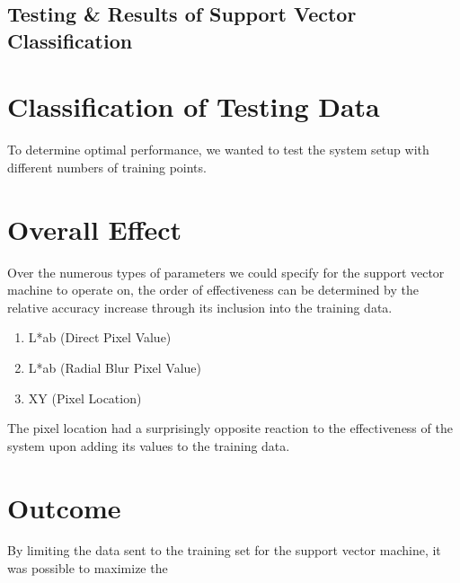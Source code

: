 \section {Testing \& Results of Support Vector Classification}

\chapter{Classification of Testing Data}
To determine optimal performance, we wanted to test the system setup with different numbers of training points.

\chapter{Overall Effect}

Over the numerous types of parameters we could specify for the support vector machine to operate on, the order of effectiveness can be determined by the relative accuracy increase through its inclusion into the training data.

\begin{enumerate}
  \item L*ab (Direct Pixel Value)
  \item L*ab (Radial Blur Pixel Value)
  \item XY (Pixel Location)
\end{enumerate}

The pixel location had a surprisingly opposite reaction to the effectiveness of the system upon adding its values to the training data.

\chapter{Outcome}

By limiting the data sent to the training set for the support vector machine, it was possible to maximize the 


